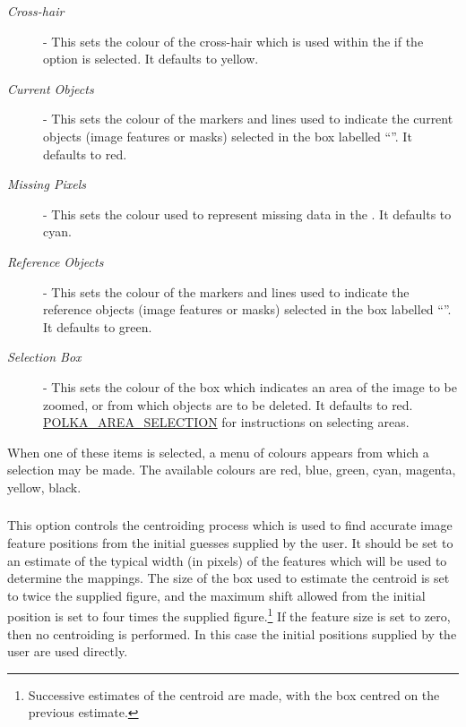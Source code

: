 \begin{description}

\item [{\em Cross-hair}] - This sets the colour of the cross-hair which
is used within the  if
the  option is
selected. It defaults to yellow.

\item [{\em Current Objects}] - This sets the colour of the markers and
lines used to indicate the current objects (image features or masks)
selected in the box labelled ``''.
It defaults to red.

\item [{\em Missing Pixels}] -  This sets the colour used to represent
missing data in the .
It defaults to cyan.

\item [{\em Reference Objects}] - This sets the colour of the markers and
lines used to indicate the reference objects (image features or masks)
selected in the box labelled ``''.
It defaults to green.

\item [{\em Selection Box}] - This sets the colour of the box
which indicates an area of the image to be zoomed, or from which objects
are to be deleted. It defaults to red. \hyperref{Go here}{See
section }{}{POLKA_AREA_SELECTION} for instructions on selecting areas.

\end{description}

When one of these items is selected, a menu of colours appears from which
a selection may be made. The available colours are red, blue, green,
cyan, magenta, yellow, black.

\subsubsection {} This option
controls the centroiding process which is used to find accurate image
feature positions from the initial guesses supplied by the user. It
should be set to an estimate of the typical width (in pixels) of the
features which will be used to determine the mappings. The size of the
box used to estimate the centroid is set to twice the supplied figure,
and the maximum shift allowed from the initial position is set to four
times the supplied figure.\footnote{Successive estimates of the centroid
are made, with the box centred on the previous estimate.} If the feature
size is set to zero, then no centroiding is performed. In this case the
initial positions supplied by the user are used directly.

